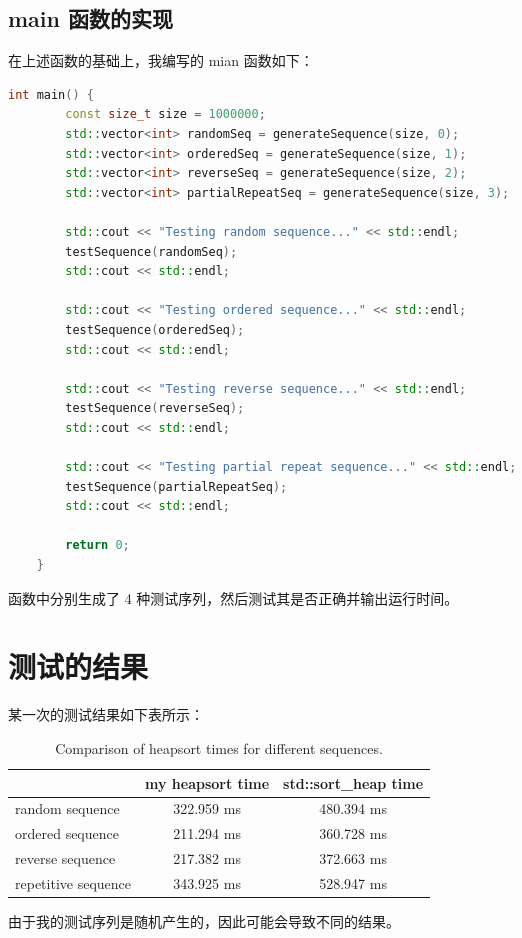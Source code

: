 \documentclass[UTF8]{ctexart}
\begin{document}
\subsection{main 函数的实现}
在上述函数的基础上，我编写的 mian 函数如下：
\begin{lstlisting}[language=c++, breaklines=true, keywordstyle=\color{blue!70}, commentstyle=\color{red!50!green!50!blue!50}, frame=shadowbox, rulesepcolor=\color{red!20!green!20!blue!20}]
    int main() {
        const size_t size = 1000000;
        std::vector<int> randomSeq = generateSequence(size, 0);
        std::vector<int> orderedSeq = generateSequence(size, 1);
        std::vector<int> reverseSeq = generateSequence(size, 2);
        std::vector<int> partialRepeatSeq = generateSequence(size, 3);
    
        std::cout << "Testing random sequence..." << std::endl;
        testSequence(randomSeq);
        std::cout << std::endl; 
    
        std::cout << "Testing ordered sequence..." << std::endl;
        testSequence(orderedSeq);
        std::cout << std::endl; 
    
        std::cout << "Testing reverse sequence..." << std::endl;
        testSequence(reverseSeq);
        std::cout << std::endl; 
    
        std::cout << "Testing partial repeat sequence..." << std::endl;
        testSequence(partialRepeatSeq);
        std::cout << std::endl; 
    
        return 0;
    }
\end{lstlisting}

函数中分别生成了 4 种测试序列，然后测试其是否正确并输出运行时间。

\section{测试的结果}

某一次的测试结果如下表所示：
\begin{table}[h!]
    \begin{center}
        \caption{Comparison of heapsort times for different sequences.}
        \begin{tabular}{l|c|c} 
            \textbf{ } & \textbf{my heapsort time} & \textbf{std::sort\_heap time}\\
            \hline
            random sequence & 322.959 ms & 480.394 ms \\
            ordered sequence & 211.294 ms & 360.728 ms \\
            reverse sequence & 217.382 ms & 372.663 ms \\
            repetitive sequence & 343.925 ms & 528.947 ms \\
        \end{tabular}
    \end{center}
\end{table}

由于我的测试序列是随机产生的，因此可能会导致不同的结果。
\end{document}
